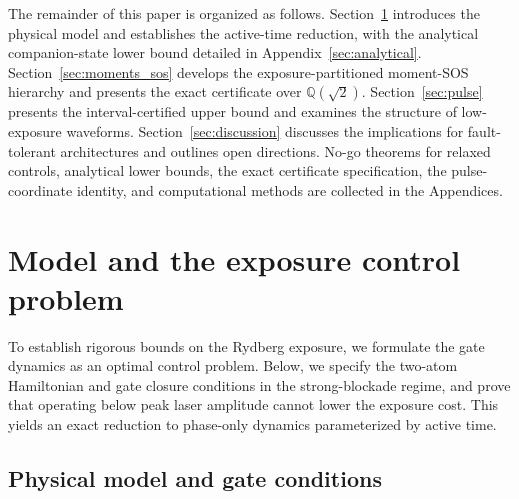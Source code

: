 \documentclass[aps,prx,reprint,nofootinbib,longbibliography,floatfix]{revtex4-2}
\theoremstyle{plain}
\theoremstyle{remark}
\begin{document}
The remainder of this paper is organized as follows. Section~\ref{sec:model} introduces the physical model and establishes the active-time reduction, with the analytical companion-state lower bound detailed in Appendix~\ref{sec:analytical}. Section~\ref{sec:moments_sos} develops the exposure-partitioned moment-SOS hierarchy and presents the exact certificate over $\mathbb{Q}(\sqrt{2})$. Section~\ref{sec:pulse} presents the interval-certified upper bound and examines the structure of low-exposure waveforms. Section~\ref{sec:discussion} discusses the implications for fault-tolerant architectures and outlines open directions. No-go theorems for relaxed controls, analytical lower bounds, the exact certificate specification, the pulse-coordinate identity, and computational methods are collected in the Appendices.

\section{Model and the exposure control problem}
\label{sec:model}

To establish rigorous bounds on the Rydberg exposure, we formulate the gate dynamics as an optimal control problem. Below, we specify the two-atom Hamiltonian and gate closure conditions in the strong-blockade regime, and prove that operating below peak laser amplitude cannot lower the exposure cost. This yields an exact reduction to phase-only dynamics parameterized by active time.

\subsection{Physical model and gate conditions}
\label{sec:model_phys}
\end{document}
